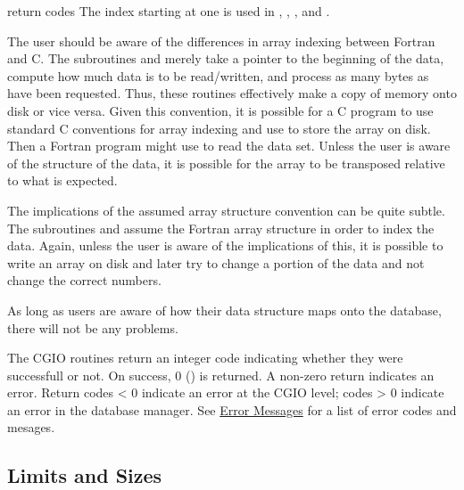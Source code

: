 \begin{Ventryi}{return codes}
      The index starting at one is used in
      \hyperlink{read_data}{},
      \hyperlink{write_data}{},
      \hyperlink{children_names}{}, and
      \hyperlink{children_ids}{}.
 
      The user should be aware of the differences in array indexing
      between Fortran and C.
      The subroutines
      \hyperlink{read_all_data}{} and
      \hyperlink{write_all_data}{}
      merely take a pointer to the beginning of the data, compute how
      much data is to be read/written, and process as many bytes as
      have been requested.
      Thus, these routines effectively make a copy of memory onto disk
      or vice versa.
      Given this convention, it is possible for a C program to
      use standard C conventions for array indexing and use
       to store the array on disk.
      Then a Fortran program might use  to
      read the data set.
      Unless the user is aware of the structure of the data, it is
      possible for the array to be transposed relative to what is
      expected.
 
      The implications of the assumed array structure convention can be
      quite subtle.
      The subroutines  and
       assume the Fortran array structure in
      order to index the data.
      Again, unless the user is aware of the implications of this, it
      is possible to write an array on disk and later try to change a
      portion of the data and not change the correct numbers.
 
      As long as users are aware of how their data structure maps onto
      the database, there will not be any problems.
\item [return codes]
      The CGIO routines return an integer code indicating whether they
      were successfull or not. On success, 0 () is
      returned. A non-zero return indicates an error. Return codes < 0
      indicate an error at the CGIO level; codes > 0 indicate an
      error in the database manager. See
      \hyperlink{s:messages}{Error Messages} for a list of
       error codes and mesages.
\end{Ventryi}

\subsection{Limits and Sizes}
\label{s:defaults}

